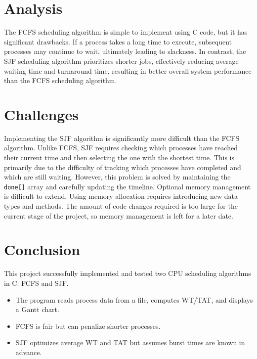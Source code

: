 \documentclass[12pt,a4paper]{article}
\begin{document}
\section{Analysis}
The FCFS scheduling algorithm is simple to implement using C code, but it has significant drawbacks. If a process takes a long time to execute, subsequent processes may continue to wait, ultimately leading to slackness. In contrast, the SJF scheduling algorithm prioritizes shorter jobs, effectively reducing average waiting time and turnaround time, resulting in better overall system performance than the FCFS scheduling algorithm.

\section{Challenges}
Implementing the SJF algorithm is significantly more difficult than the FCFS algorithm. Unlike FCFS, SJF requires checking which processes have reached their current time and then selecting the one with the shortest time. This is primarily due to the difficulty of tracking which processes have completed and which are still waiting. However, this problem is solved by maintaining the \texttt{done[]} array and carefully updating the timeline.
Optional memory management is difficult to extend. Using memory allocation requires introducing new data types and methods. The amount of code changes required is too large for the current stage of the project, so memory management is left for a later date.

\section{Conclusion}
This project successfully implemented and tested two CPU scheduling algorithms in C: FCFS and SJF.  

\begin{itemize}
    \item The program reads process data from a file, computes WT/TAT, and displays a Gantt chart.  
    \item FCFS is fair but can penalize shorter processes.  
    \item SJF optimizes average WT and TAT but assumes burst times are known in advance.  
\end{itemize}
\end{document}
